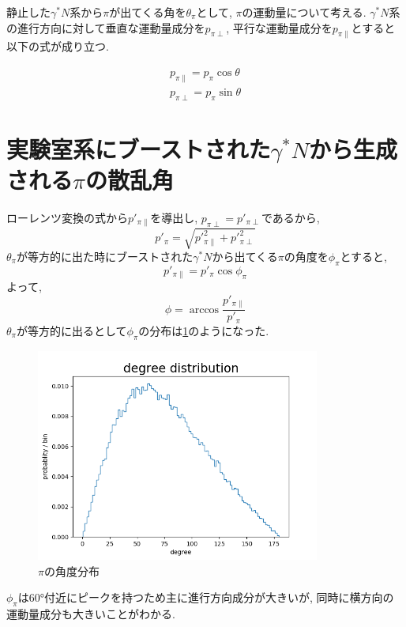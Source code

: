 静止した$\gamma^* N$系から$\pi$が出てくる角を$\theta_\pi$として, 
$\pi$の運動量について考える.
$\gamma^* N$系の進行方向に対して垂直な運動量成分を$p_{\pi \perp}$, 平行な運動量成分を$p_{\pi \parallel}$とすると以下の式が成り立つ.

\begin{eqnarray}
    p_{\pi \parallel} = p_\pi  \cos\theta \\
    p_{\pi \perp} = p_\pi \sin\theta
\end{eqnarray}

\section{\texorpdfstring{実験室系にブーストされた$\gamma^* N$から生成される$\pi$の散乱角}{LG}}
ローレンツ変換の式から$p'_{\pi \parallel}$を導出し, $p_{\pi \perp} = p'_{\pi \perp}$であるから, 
\begin{equation}
    p'_\pi = \sqrt{p'^2_{\pi \parallel} + p'^2_{\pi \perp} }
\end{equation}
$\theta_\pi$が等方的に出た時にブーストされた$\gamma^* N$から出てくる$\pi$の角度を$\phi_\pi$とすると,
\begin{equation}
    p'_{\pi \parallel} = p'_\pi \cos{\phi_\pi}
\end{equation}
よって, 
\begin{equation}
    \phi = \arccos{\dfrac{p'_{\pi \parallel}}{p'_\pi}}
\end{equation}
$\theta_\pi$が等方的に出るとして$\phi_\pi$の分布は\ref{fig:angle8}のようになった.
\begin{figure}[H]
    \centering
    \includegraphics[height=7cm]{img/degree_distribution.png}
    \caption{$\pi$の角度分布}
    \label{fig:angle8}
\end{figure}
$\phi_\pi$は60°付近にピークを持つため主に進行方向成分が大きいが, 
同時に横方向の運動量成分も大きいことがわかる.
